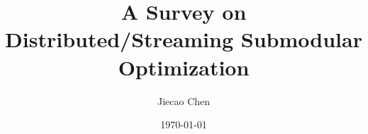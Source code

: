 \documentclass[11pt]{article}
\begin{document}
\title{A Survey on \\ Distributed/Streaming Submodular Optimization}
\author{Jiecao Chen}
\date{\today}

\maketitle













%
\end{document}
